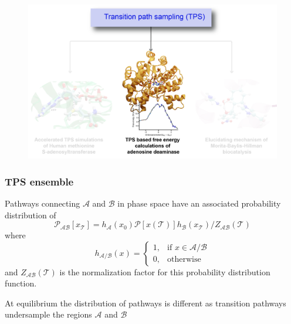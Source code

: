 \documentclass{beamer}
\begin{document}
\begin{frame}
 \begin{figure}
\centering
\includegraphics[scale=0.6]{figures/sree_outline_2.png}
  \end{figure}
\end{frame}
\begin{frame}
\frametitle{TPS ensemble}
Pathways connecting $\mathcal{A}$ and $\mathcal{B}$ in phase space have an associated probability distribution of
\begin{equation}
\mathcal{P}_{\mathcal{AB}}[x_{\mathcal{T}}] = h_{\mathcal{A}}(x_0)\mathcal{P}[x(\mathcal{T})]
h_{\mathcal{B}}(x_{\mathcal{T}})/Z_{\mathcal{AB}}(\mathcal{T})\label{eqn:tpsensem}\nonumber 
\end{equation}
where 
\[
    h_{\mathcal{A}/\mathcal{B}}(x)= 
\begin{cases}
    1, & \text{if } x\in \mathcal{A}/\mathcal{B}\\
    0,              & \text{otherwise}
\end{cases}
\]
and $Z_{\mathcal{AB}}(\mathcal{T})$ is the normalization factor for this 
probability distribution function.
\begin{block}{}
At equilibrium the distribution of pathways is different as transition pathways undersample the 
regions $\mathcal{A}$ and $\mathcal{B}$
\end{block}
\end{frame}
%
\end{document}
